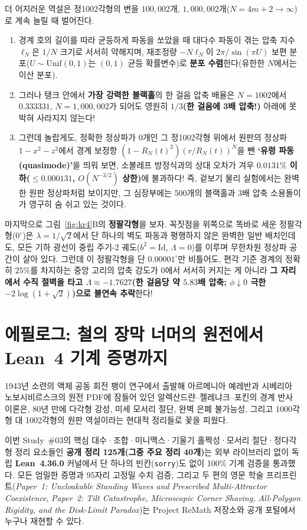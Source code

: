 \documentclass[11pt,a4paper]{article}
\begin{document}
더 어지러운 역설은 정1002각형의 변을 $100{,}002$개, $1{,}000{,}002$개($N = 4m+2 \to \infty$)로 계속 늘릴 때 벌어진다.
\begin{enumerate}
  \item 경계 호의 길이를 따라 균등하게 파동을 쏘았을 때 대다수 파동이 겪는 압축 지수 $\ell_N$은 $1/N$ 크기로 서서히 약해지며, 재조정량 $-N\ell_N$이 $2\pi/\sin(\pi U)$ 보편 분포($U \sim \mathrm{Unif}(0,1)$는 $(0,1)$ 균등 확률변수)로 \textbf{분포 수렴}한다(유한한 $N$에서는 이산 분포).
  \item 그러나 탱크 안에서 \textbf{가장 강력한 블랙홀}의 한 걸음 압축 배율은 $N=1002$에서 $0.333331$, $N=1{,}000{,}002$가 되어도 영원히 \textbf{$1/3$(한 걸음에 3배 압축!)} 아래에 못 박혀 사라지지 않는다!
  \item 그런데 놀랍게도, 정확한 정상파가 $0$개인 그 정1002각형 위에서 원판의 정상파 $1 - x^2 - z^2$에서 경계 보정항 $(1-R_N(t)^2)(r/R_N(t))^N$을 뺀 \textbf{`유령 파동(quasimode)'}을 띄워 보면, 소볼레프 방정식과의 상대 오차가 겨우 \textbf{$0.0131\%$ 이하($\le 0.000131$, $O(N^{-3/2})$ 상한)}에 불과하다! 즉, 겉보기 물리 실험에서는 완벽한 원판 정상파처럼 보이지만, 그 심장부에는 500개의 블랙홀과 $3$배 압축 소용돌이가 영구히 숨 쉬고 있는 것이다.
\end{enumerate}

마지막으로 그림~\ref{fig:kr4}B의 \textbf{정팔각형}을 보자. 꼭짓점을 위쪽으로 똑바로 세운 정팔각형($0^\circ$)은 $\lambda = 1/\sqrt{2}$에서 단 하나의 벽도 파동과 평행하지 않은 완벽한 일반 배치인데도, 모든 기하 광선이 중립 주기-2 궤도($b^2 = \mathrm{Id}$, $\Lambda = 0$)를 이루며 무한차원 정상파 공간이 살아 있다. 그런데 이 정팔각형을 단 \textbf{$0.00001^\circ$}만 비틀어도, 편각 기준 경계의 정확히 $25\%$를 차지하는 중앙 고리의 압축 강도가 $0$에서 서서히 커지는 게 아니라 \textbf{그 자리에서 수직 절벽을 타고 $\Lambda \approx -1.7627$(한 걸음당 약 $5.83$배 압축; $\phi \downarrow 0$ 극한 $-2\log(1+\sqrt{2})$)으로 불연속 추락}한다!

\section{에필로그: 철의 장막 너머의 원전에서 Lean~4 기계 증명까지}

1943년 소련의 액체 공동 회전 팽이 연구에서 출발해 아르메니아 예레반과 시베리아 노보시비르스크의 원전 PDF에 잠들어 있던 알렉산드랸--젤레냐크--포킨의 경계 반사 이론은, 80년 만에 다각형 강성, 미세 모서리 절단, 완벽 은폐 불가능성, 그리고 1000각형 대 1002각형의 원판 역설이라는 현대적 정리들로 꽃을 피웠다.

이번 Study~\#03의 핵심 대수·조합·미니맥스·기울기 홀짝성·모서리 절단·정다각형 정리 요소들인 \textbf{공개 정리 125개(그중 주요 정리 40개)}는 외부 라이브러리 없이 독립 \textbf{Lean~4.36.0} 커널에서 단 하나의 빈칸(\texttt{sorry})도 없이 100\% 기계 검증을 통과했다. 모든 엄밀한 증명과 95자리 고정밀 수치 검증, 그리고 두 편의 영문 학술 프리프린트(\textit{Paper~1: Uncloakable Standing Waves and Prescribed Multi-Attractor Coexistence}, \textit{Paper~2: Tilt Catastrophe, Microscopic Corner Shaving, All-Polygon Rigidity, and the Disk-Limit Paradox})는 Project ReMath 저장소와 공개 포털에서 누구나 재현할 수 있다.
\end{document}
